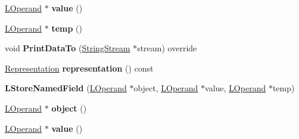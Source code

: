 \begin{DoxyCompactItemize}
\item 
\hyperlink{classv8_1_1internal_1_1_l_operand}{L\+Operand} $\ast$ {\bfseries value} ()\hypertarget{classv8_1_1internal_1_1_l_store_named_field_a7c1b623b85070a53e7c8ca36113808c7}{}\label{classv8_1_1internal_1_1_l_store_named_field_a7c1b623b85070a53e7c8ca36113808c7}

\item 
\hyperlink{classv8_1_1internal_1_1_l_operand}{L\+Operand} $\ast$ {\bfseries temp} ()\hypertarget{classv8_1_1internal_1_1_l_store_named_field_ad77491ce510eaa0f150539ec8815c14f}{}\label{classv8_1_1internal_1_1_l_store_named_field_ad77491ce510eaa0f150539ec8815c14f}

\item 
void {\bfseries Print\+Data\+To} (\hyperlink{classv8_1_1internal_1_1_string_stream}{String\+Stream} $\ast$stream) override\hypertarget{classv8_1_1internal_1_1_l_store_named_field_a737f49c6847cd030f17c69b314c54b6c}{}\label{classv8_1_1internal_1_1_l_store_named_field_a737f49c6847cd030f17c69b314c54b6c}

\item 
\hyperlink{classv8_1_1internal_1_1_representation}{Representation} {\bfseries representation} () const \hypertarget{classv8_1_1internal_1_1_l_store_named_field_acf09ef122d9ca6738894c92b8f3e24ef}{}\label{classv8_1_1internal_1_1_l_store_named_field_acf09ef122d9ca6738894c92b8f3e24ef}

\item 
{\bfseries L\+Store\+Named\+Field} (\hyperlink{classv8_1_1internal_1_1_l_operand}{L\+Operand} $\ast$object, \hyperlink{classv8_1_1internal_1_1_l_operand}{L\+Operand} $\ast$value, \hyperlink{classv8_1_1internal_1_1_l_operand}{L\+Operand} $\ast$temp)\hypertarget{classv8_1_1internal_1_1_l_store_named_field_a6d2a4f20bdb4927c9401f7f7dd706d15}{}\label{classv8_1_1internal_1_1_l_store_named_field_a6d2a4f20bdb4927c9401f7f7dd706d15}

\item 
\hyperlink{classv8_1_1internal_1_1_l_operand}{L\+Operand} $\ast$ {\bfseries object} ()\hypertarget{classv8_1_1internal_1_1_l_store_named_field_a322fe15f20a68dfd3429f31bb46ce109}{}\label{classv8_1_1internal_1_1_l_store_named_field_a322fe15f20a68dfd3429f31bb46ce109}

\item 
\hyperlink{classv8_1_1internal_1_1_l_operand}{L\+Operand} $\ast$ {\bfseries value} ()\hypertarget{classv8_1_1internal_1_1_l_store_named_field_a7c1b623b85070a53e7c8ca36113808c7}{}\label{classv8_1_1internal_1_1_l_store_named_field_a7c1b623b85070a53e7c8ca36113808c7}


\end{DoxyCompactItemize}
